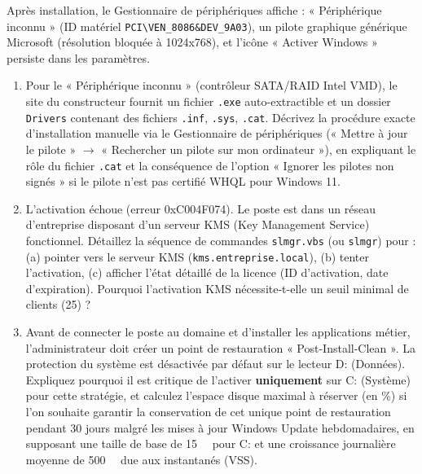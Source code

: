 \documentclass[11pt]{article}
\begin{document}
\begin{exercice}
Après installation, le Gestionnaire de périphériques affiche : « Périphérique inconnu » (ID matériel \texttt{PCI\textbackslash VEN\_8086\&DEV\_9A03}), un pilote graphique générique Microsoft (résolution bloquée à 1024x768), et l'icône « Activer Windows » persiste dans les paramètres.
\begin{enumerate}
    \item Pour le « Périphérique inconnu » (contrôleur SATA/RAID Intel VMD), le site du constructeur fournit un fichier \texttt{.exe} auto-extractible et un dossier \texttt{Drivers} contenant des fichiers \texttt{.inf}, \texttt{.sys}, \texttt{.cat}. Décrivez la procédure exacte d'installation manuelle via le Gestionnaire de périphériques (« Mettre à jour le pilote » $\rightarrow$ « Rechercher un pilote sur mon ordinateur »), en expliquant le rôle du fichier \texttt{.cat} et la conséquence de l'option « Ignorer les pilotes non signés » si le pilote n'est pas certifié WHQL pour Windows 11.
    \item L'activation échoue (erreur 0xC004F074). Le poste est dans un réseau d'entreprise disposant d'un serveur KMS (Key Management Service) fonctionnel. Détaillez la séquence de commandes \texttt{slmgr.vbs} (ou \texttt{slmgr}) pour : (a) pointer vers le serveur KMS (\texttt{kms.entreprise.local}), (b) tenter l'activation, (c) afficher l'état détaillé de la licence (ID d'activation, date d'expiration). Pourquoi l'activation KMS nécessite-t-elle un seuil minimal de clients (25) ?
    \item Avant de connecter le poste au domaine et d'installer les applications métier, l'administrateur doit créer un point de restauration « Post-Install-Clean ». La protection du système est désactivée par défaut sur le lecteur D: (Données). Expliquez pourquoi il est critique de l'activer \textbf{uniquement} sur C: (Système) pour cette stratégie, et calculez l'espace disque maximal à réserver (en \%) si l'on souhaite garantir la conservation de cet unique point de restauration pendant 30 jours malgré les mises à jour Windows Update hebdomadaires, en supposant une taille de base de \SI{15}{\giga\byte} pour C: et une croissance journalière moyenne de \SI{500}{\mega\byte} due aux instantanés (VSS).
\end{enumerate}
\end{exercice}
\end{document}
